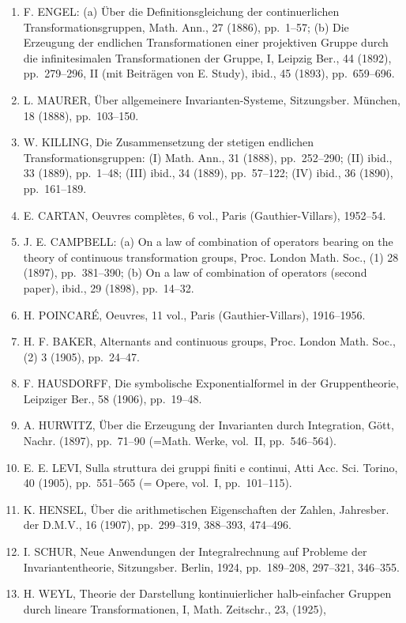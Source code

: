 \begin{enumerate}
\item
  F. ENGEL: (a) Über die Definitionsgleichung der continuerlichen Transformationsgruppen, Math. Ann., 27 (1886), pp.~1--57; (b) Die Erzeugung der endlichen Transformationen einer projektiven Gruppe durch die infinitesimalen Transformationen der Gruppe, I, Leipzig Ber., 44 (1892), pp.~279--296, II (mit Beiträgen von E. Study), ibid., 45 (1893), pp.~659--696.
\item
  L. MAURER, Über allgemeinere Invarianten-Systeme, Sitzungsber. München, 18 (1888), pp.~103--150.
\item
  W. KILLING, Die Zusammensetzung der stetigen endlichen Transformationsgruppen: (I) Math. Ann., 31 (1888), pp.~252--290; (II) ibid., 33 (1889), pp.~1--48; (III) ibid., 34 (1889), pp.~57--122; (IV) ibid., 36 (1890), pp.~161--189.
\item
  E. CARTAN, Oeuvres complètes, 6 vol., Paris (Gauthier-Villars), 1952--54.
\item
  J. E. CAMPBELL: (a) On a law of combination of operators bearing on the theory of continuous transformation groups, Proc. London Math. Soc., (1) 28 (1897), pp.~381--390; (b) On a law of combination of operators (second paper), ibid., 29 (1898), pp.~14--32.
\item
  H. POINCARÉ, Oeuvres, 11 vol., Paris (Gauthier-Villars), 1916--1956.
\item
  H. F. BAKER, Alternants and continuous groups, Proc. London Math. Soc., (2) 3 (1905), pp.~24--47.
\item
  F. HAUSDORFF, Die symbolische Exponentialformel in der Gruppentheorie, Leipziger Ber., 58 (1906), pp.~19--48.
\item
  A. HURWITZ, Über die Erzeugung der Invarianten durch Integration, Gött, Nachr. (1897), pp.~71--90 (=Math. Werke, vol.~II, pp.~546--564).
\item
  E. E. LEVI, Sulla struttura dei gruppi finiti e continui, Atti Acc. Sci. Torino, 40 (1905), pp.~551--565 (= Opere, vol.~I, pp.~101--115).
\item
  K. HENSEL, Über die arithmetischen Eigenschaften der Zahlen, Jahresber. der D.M.V., 16 (1907), pp.~299--319, 388--393, 474--496.
\item
  I. SCHUR, Neue Anwendungen der Integralrechnung auf Probleme der Invariantentheorie, Sitzungsber. Berlin, 1924, pp.~189--208, 297--321, 346--355.
\item
  H. WEYL, Theorie der Darstellung kontinuierlicher halb-einfacher Gruppen durch lineare Transformationen, I, Math. Zeitschr., 23, (1925),
\end{enumerate}

